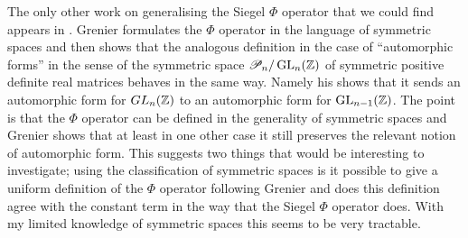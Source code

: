 The only other work on generalising the Siegel \(\Phi\) operator that we could find appears in \cite{grenierANALOGUESIEGELXOPERATOR2024}. 
Grenier formulates the \(\Phi\) operator in the language of symmetric spaces \cite[Ch. 2]{terrasHarmonicAnalysisSymmetric2016} and then shows that the analogous definition in the case of ``automorphic forms'' in the sense of the symmetric space \(\mathscr{P}_n/\GL_n(\Z)\) of symmetric positive definite real matrices \cite[1.5.1]{terrasHarmonicAnalysisSymmetric2016} behaves in the same way. Namely his \cite[Thm. 2]{grenierAnalogueSiegelFOperator1992} shows that it sends an automorphic form for \(
GL_n(\Z)\) to an automorphic form for \(\GL_{n-1}(\Z)\). The point is that the \(\Phi\) operator can be defined in the generality of symmetric spaces and Grenier shows that at least in one other case it still preserves the relevant notion of automorphic form. This suggests two things that would be interesting to investigate; using the classification of symmetric spaces is it possible to give a uniform definition of the \(\Phi\) operator following Grenier and does this definition agree with the constant term in the way that the Siegel \(\Phi\) operator does. With my limited knowledge of symmetric spaces this seems to be very tractable.

